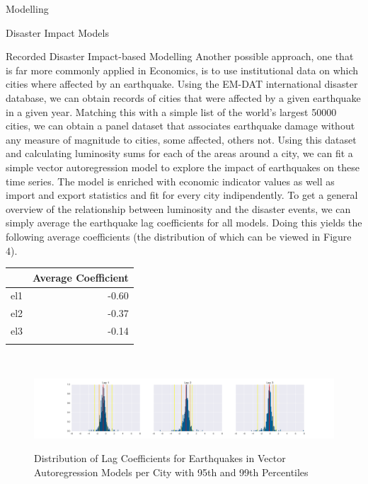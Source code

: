 \documentclass[12.5pt,fleqn,leqno,letterpaper]{article}
\begin{document}
\begin{section}{Modelling}
\begin{subsection}{Disaster Impact Models}
    \begin{subsubsection}{Recorded Disaster Impact-based Modelling}
      Another possible approach, one that is far more commonly applied in Economics, is to use institutional data on which cities where affected by an earthquake. Using the EM-DAT international disaster database, we can obtain records of cities that were affected by a given earthquake in a given year. Matching this with a simple list of the world's largest 50000 cities, we can obtain a panel dataset that associates earthquake damage without any measure of magnitude to cities, some affected, others not.
      Using this dataset and calculating luminosity sums for each of the areas around a city, we can fit a simple vector autoregression model to explore the impact of earthquakes on these time series. The model is enriched with economic indicator values as well as import and export statistics and fit for every city indipendently. To get a general overview of the relationship between luminosity and the disaster events, we can simply average the earthquake lag coefficients for all models. Doing this yields the following average coefficients (the distribution of which can be viewed in Figure 4).\\
      \begin{center}
        \begin{tabular}{lr}\\
          \toprule
          {} & Average Coefficient \\
          \midrule
          el1 & -0.60 \\
          el2 & -0.37 \\
          el3 & -0.14 \\
          \bottomrule\\
        \end{tabular}\\
      \end{center}
      \begin{figure}
        \centering
        \includegraphics[width=\linewidth]{non_balanced_earthquake_coefficients_distribution}\label{fig:non_balanced_earthquake_coefficients_distribution}
        \caption{Distribution of Lag Coefficients for Earthquakes in Vector Autoregression Models per City with 95th and 99th Percentiles}

\end{figure}
\end{subsubsection}
\end{subsection}
\end{section}
\end{document}
